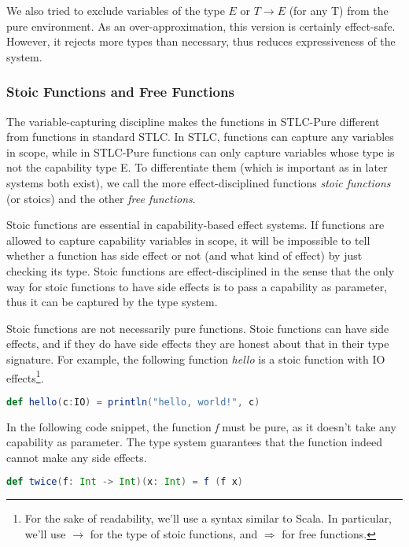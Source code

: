 We also tried to exclude variables of the type $E$ or $T \to E$ (for
any T) from the pure environment. As an over-approximation, this
version is certainly effect-safe. However, it rejects more types than
necessary, thus reduces expressiveness of the system.

\subsubsection{Stoic Functions and Free Functions}

The variable-capturing discipline makes the functions in STLC-Pure
different from functions in standard STLC. In STLC, functions can
capture any variables in scope, while in STLC-Pure functions can only
capture variables whose type is not the capability type E. To
differentiate them (which is important as in later systems both
exist), we call the more effect-disciplined functions \emph{stoic
  functions} (or stoics) and the other \emph{free functions}.

Stoic functions are essential in capability-based effect systems. If
functions are allowed to capture capability variables in scope, it
will be impossible to tell whether a function has side effect or not
(and what kind of effect) by just checking its type. Stoic functions
are effect-disciplined in the sense that the only way for stoic
functions to have side effects is to pass a capability as parameter,
thus it can be captured by the type system.

Stoic functions are not necessarily pure functions. Stoic functions
can have side effects, and if they do have side effects they are
honest about that in their type signature. For example, the following
function \emph{hello} is a stoic function with IO effects\footnote{For
  the sake of readability, we'll use a syntax similar to Scala. In
  particular, we'll use $\to$ for the type of stoic functions, and
  $\Rightarrow$ for free functions.}.

\begin{lstlisting}[language=Scala]
  def hello(c:IO) = println("hello, world!", c)
\end{lstlisting}

In the following code snippet, the function \emph{f} must be pure, as
it doesn't take any capability as parameter. The type system
guarantees that the function indeed cannot make any side effects.

\begin{lstlisting}[language=Scala]
  def twice(f: Int -> Int)(x: Int) = f (f x)
\end{lstlisting}

